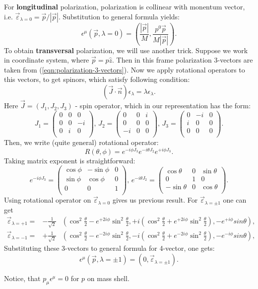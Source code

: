 \documentclass[12pt]{revtex4-1}
\newcommand{\jx}{\left( \begin{array}{ccc}
0 & 0 & 0 \\
0 & 0 & -i \\
0 & i & 0 \\
\end{array}
\right)}
\newcommand{\jy}{\left( \begin{array}{ccc}
0 & 0 & i \\
0 & 0 & 0 \\
-i & 0 & 0 \\
\end{array}
\right)}
\newcommand{\jz}{\left( \begin{array}{ccc}
0 & -i & 0 \\
i & 0 & 0 \\
0 & 0 & 0 \\
\end{array}
\right)}
\begin{document}
For \textbf{longitudinal} polarization, polarization is collinear with
monentum vector, i.e. $\vec{\varepsilon}_{\lambda = 0} = \vec{p}/|\vec{p}|$.
Substitution to general formula yields:
\begin{equation}
	\epsilon^{\mu}(\vec p, \lambda = 0) = \left( \frac{|\vec{p}|}{M} ,
	\frac{p^0 \vec{p}}{M |\vec{p}|}	\right).
\end{equation}
To obtain \textbf{transversal} polarization, we will use another trick.
Suppose we work in coordinate system, where $\vec{p} = p \hat{z}$.
Then in this frame polarization 3-vectors are taken from 
(\ref{eqn:polarization-3-vectors}). Now we apply rotational operators
to this vectors, to get spinors, which satisfy following condition:
\begin{equation}
	(\vec{J} \cdot \vec{n} ) \epsilon_{\lambda} = \lambda \epsilon_{\lambda}.
\end{equation}
Here $\vec{J} = (J_1, J_2, J_3)$ - spin operator, which in our representation
has the form:
\begin{equation}
	J_1 = \jx,\, J_2 = \jy,\, J_3 = \jz. 
\end{equation}
Then, we write (quite general) rotational operator:
\begin{equation}
	R(\theta, \phi) = e^{-i \phi J_3} e^{- i \theta J_2} e^{+ i \phi J_3}.
\end{equation}
Taking matrix exponent is straightforward:
\begin{equation*}
e^{-i \phi J_3} = 
\left(
\begin{array}{ccc}
 \cos \phi & -\sin\phi & 0 \\
 \sin \phi & \cos \phi & 0 \\
 0 & 0 & 1 \\
\end{array}
\right),\,
e^{-i \theta J_2} = 
\left(
\begin{array}{ccc}
 \cos \theta & 0 & \sin \theta \\
 0 & 1 & 0 \\
 -\sin \theta & 0 & \cos \theta \\
\end{array}
\right).
\end{equation*}
Using rotational operator on $\vec \varepsilon_{\lambda = 0}$ gives us
previous result. For $\vec \varepsilon_{\lambda = \pm 1}$ one can get
\begin{align} \label{eqn:polarization-3-vectors}
	\vec{\varepsilon}_{\lambda = +1}= & -\frac{1}{\sqrt{2}} &
	\left(\cos^2 \frac{\theta}{2} - e^{+2 i \phi}\sin^2 \frac{\theta}{2} ,
	+i(\cos^2 \frac{\theta}{2} + e^{+2 i \phi}\sin^2 \frac{\theta}{2}) ,
	- e^{+i \phi} sin \theta \right),
	\\
	\vec{\varepsilon}_{\lambda = -1}= & +\frac{1}{\sqrt{2}} &
	\left(\cos^2 \frac{\theta}{2} - e^{-2 i \phi}\sin^2 \frac{\theta}{2} , 
	-i(\cos^2 \frac{\theta}{2} + e^{-2 i \phi}\sin^2 \frac{\theta}{2}) ,
	- e^{-i \phi} sin \theta \right),
\end{align}
Substituting these 3-vectors to general formula for 4-vector, one gets:
\begin{equation}
	\epsilon^{\mu}(\vec p, \lambda = \pm 1) = \left( 0 ,
	\vec{\varepsilon}_{\lambda = \pm 1} \right).
\end{equation}

Notice, that $p_{\mu} \epsilon^{\mu} = 0$ for $p$ on mass shell.
\end{document}
